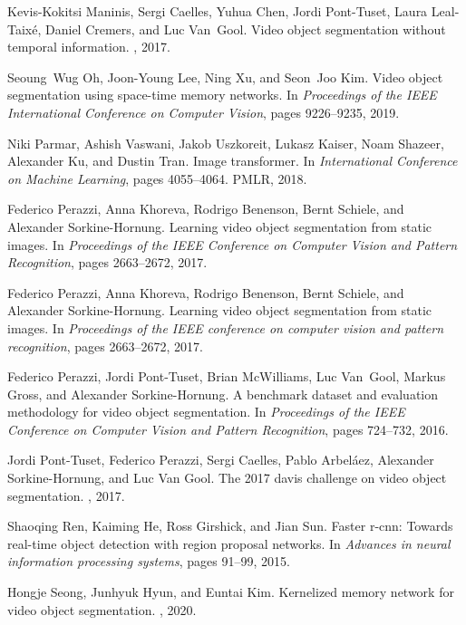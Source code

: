 \documentclass[final]{cvpr}
\begin{document}
{\begin{thebibliography}{10}
Kevis-Kokitsi Maninis, Sergi Caelles, Yuhua Chen, Jordi Pont-Tuset, Laura
  Leal-Taix{\'e}, Daniel Cremers, and Luc Van~Gool.
\newblock Video object segmentation without temporal information.
, 2017.

Seoung~Wug Oh, Joon-Young Lee, Ning Xu, and Seon~Joo Kim.
\newblock Video object segmentation using space-time memory networks.
\newblock In {\em Proceedings of the IEEE International Conference on Computer
  Vision}, pages 9226--9235, 2019.

Niki Parmar, Ashish Vaswani, Jakob Uszkoreit, Lukasz Kaiser, Noam Shazeer,
  Alexander Ku, and Dustin Tran.
\newblock Image transformer.
\newblock In {\em International Conference on Machine Learning}, pages
  4055--4064. PMLR, 2018.

Federico Perazzi, Anna Khoreva, Rodrigo Benenson, Bernt Schiele, and Alexander
  Sorkine-Hornung.
\newblock Learning video object segmentation from static images.
\newblock In {\em Proceedings of the IEEE Conference on Computer Vision and
  Pattern Recognition}, pages 2663--2672, 2017.

Federico Perazzi, Anna Khoreva, Rodrigo Benenson, Bernt Schiele, and Alexander
  Sorkine-Hornung.
\newblock Learning video object segmentation from static images.
\newblock In {\em Proceedings of the IEEE conference on computer vision and
  pattern recognition}, pages 2663--2672, 2017.

Federico Perazzi, Jordi Pont-Tuset, Brian McWilliams, Luc Van~Gool, Markus
  Gross, and Alexander Sorkine-Hornung.
\newblock A benchmark dataset and evaluation methodology for video object
  segmentation.
\newblock In {\em Proceedings of the IEEE Conference on Computer Vision and
  Pattern Recognition}, pages 724--732, 2016.

Jordi Pont-Tuset, Federico Perazzi, Sergi Caelles, Pablo Arbel\'aez, Alexander
  Sorkine-Hornung, and Luc {Van Gool}.
\newblock The 2017 davis challenge on video object segmentation.
, 2017.

Shaoqing Ren, Kaiming He, Ross Girshick, and Jian Sun.
\newblock Faster r-cnn: Towards real-time object detection with region proposal
  networks.
\newblock In {\em Advances in neural information processing systems}, pages
  91--99, 2015.

Hongje Seong, Junhyuk Hyun, and Euntai Kim.
\newblock Kernelized memory network for video object segmentation.
, 2020.


\end{thebibliography}}
\end{document}
